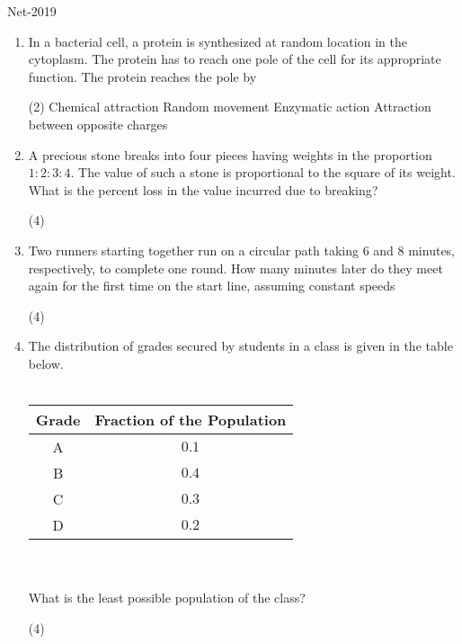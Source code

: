 \begin{abox}
	Net-2019 
\end{abox}
\begin{enumerate}
	\item In a bacterial cell, a protein is synthesized at random location in the cytoplasm. The protein has to reach one pole of the cell for its appropriate function. The protein reaches the pole by
	 \begin{tasks}(2)
		\task[\textbf{a.}]Chemical attraction
		\task[\textbf{b.}]Random movement
		\task[\textbf{c.}]Enzymatic action
		\task[\textbf{d.}] Attraction between opposite charges
	\end{tasks}
	\item A precious stone breaks into four pieces having weights in the proportion $1: 2: 3: 4$. The value of such a stone is proportional to the square of its weight. What is the percent loss in the value incurred due to breaking?
	 \begin{tasks}(4)
	\end{tasks}
	\item Two runners starting together run on a circular path taking 6 and 8 minutes, respectively, to complete one round. How many minutes later do they meet again for the first time on the start line, assuming constant speeds
	 \begin{tasks}(4)
	\end{tasks}
	\item 	 The distribution of grades secured by students in a class is given in the table below.\\\\
	\renewcommand*{\arraystretch}{1.2}
	\begin{tabular}{|c|c|}
		\hline Grade & Fraction of the Population \\
		\hline A & $0.1$ \\
		\hline B & $0.4$ \\
		\hline C & $0.3$ \\
		\hline D & $0.2$ \\
		\hline
	\end{tabular}\\\\
	What is the least possible population of the class?
	 \begin{tasks}(4)

\end{tasks}
\end{enumerate}
